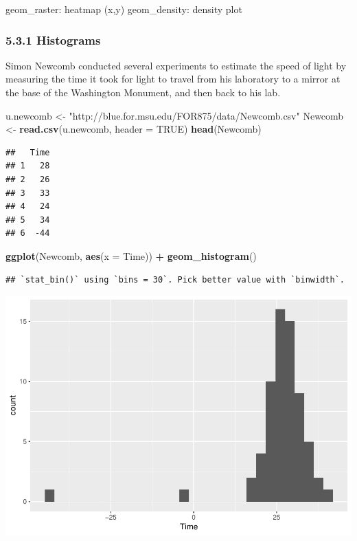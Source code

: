 \documentclass[]{article}
\newenvironment{Shaded}{\begin{snugshade}}{\end{snugshade}}
\newcommand{\KeywordTok}[1]{\textcolor[rgb]{0.13,0.29,0.53}{\textbf{#1}}}
\newcommand{\DataTypeTok}[1]{\textcolor[rgb]{0.13,0.29,0.53}{#1}}
\newcommand{\StringTok}[1]{\textcolor[rgb]{0.31,0.60,0.02}{#1}}
\newcommand{\OtherTok}[1]{\textcolor[rgb]{0.56,0.35,0.01}{#1}}
\newcommand{\OperatorTok}[1]{\textcolor[rgb]{0.81,0.36,0.00}{\textbf{#1}}}
\newcommand{\NormalTok}[1]{#1}
\begin{document}
geom\_raster: heatmap (x,y) geom\_density: density plot

\subsubsection{5.3.1 Histograms}\label{histograms}

Simon Newcomb conducted several experiments to estimate the speed of
light by measuring the time it took for light to travel from his
laboratory to a mirror at the base of the Washington Monument, and then
back to his lab.

\begin{Shaded}
\begin{Highlighting}[]
\NormalTok{u.newcomb <-}\StringTok{ "http://blue.for.msu.edu/FOR875/data/Newcomb.csv"}
\NormalTok{Newcomb <-}\StringTok{ }\KeywordTok{read.csv}\NormalTok{(u.newcomb, }\DataTypeTok{header =} \OtherTok{TRUE}\NormalTok{)}
\KeywordTok{head}\NormalTok{(Newcomb)}
\end{Highlighting}
\end{Shaded}

\begin{verbatim}
##   Time
## 1   28
## 2   26
## 3   33
## 4   24
## 5   34
## 6  -44
\end{verbatim}

\begin{Shaded}
\begin{Highlighting}[]
\KeywordTok{ggplot}\NormalTok{(Newcomb, }\KeywordTok{aes}\NormalTok{(}\DataTypeTok{x =}\NormalTok{ Time)) }\OperatorTok{+}\StringTok{ }\KeywordTok{geom_histogram}\NormalTok{()}
\end{Highlighting}
\end{Shaded}

\begin{verbatim}
## `stat_bin()` using `bins = 30`. Pick better value with `binwidth`.
\end{verbatim}

\includegraphics{stt-301-programming_files/figure-latex/unnamed-chunk-67-1.pdf}
\end{document}
